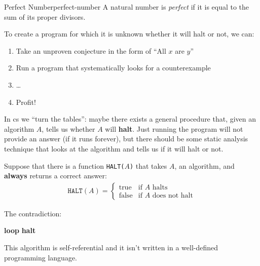 \begin{definition}{Perfect Number}{perfect-number}
    A natural number is \textit{perfect} if it is equal to the sum of its proper divisors.
\end{definition}

To create a program for which it is unknown whether it will halt or not, we can:
\begin{enumerate}
    \item Take an unproven conjecture in the form of ``All \(x\) are \(y\)''
    \item Run a program that systematically looks for a counterexample
    \item \dots
    \item Profit!
\end{enumerate}

In \gls{cs} we ``turn the tables'': maybe there exists a general procedure that, given an algorithm \(A\), tells us whether \(A\) will \textbf{halt}. Just running the program will not provide an answer (if it runs forever), but there should be some static analysis technique that looks at the algorithm and tells us if it will halt or not.

Suppose that there is a function \texttt{HALT(\(A\))} that takes \(A\), an algorithm, and \textbf{always} returns a correct answer:
\begin{align}
    \texttt{HALT}(A)=\begin{cases}
        \text{true} & \text{if } A \text{ halts}\\
        \text{false} & \text{if } A \text{ does not halt}
    \end{cases}
\end{align}

The contradiction:
\begin{algorithm}[H]
    \caption{Halting paradox}
    \begin{algorithmic}
            \State \textbf{loop}
        \Else {}
            \State \textbf{halt}
        \EndIf {}
    \EndProcedure
    \end{algorithmic}
\end{algorithm}

This algorithm is self-referential and it isn't written in a well-defined programming language.
